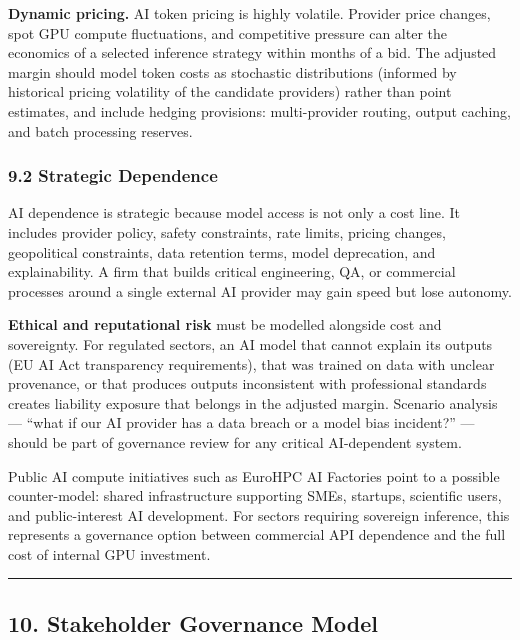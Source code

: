\documentclass[
]{article}
\begin{document}
\textbf{Dynamic pricing.} AI token pricing is highly volatile. Provider
price changes, spot GPU compute fluctuations, and competitive pressure
can alter the economics of a selected inference strategy within months
of a bid. The adjusted margin should model token costs as stochastic
distributions (informed by historical pricing volatility of the
candidate providers) rather than point estimates, and include hedging
provisions: multi-provider routing, output caching, and batch processing
reserves.

\subsubsection{9.2 Strategic Dependence}\label{strategic-dependence}

AI dependence is strategic because model access is not only a cost line.
It includes provider policy, safety constraints, rate limits, pricing
changes, geopolitical constraints, data retention terms, model
deprecation, and explainability. A firm that builds critical
engineering, QA, or commercial processes around a single external AI
provider may gain speed but lose autonomy.

\textbf{Ethical and reputational risk} must be modelled alongside cost
and sovereignty. For regulated sectors, an AI model that cannot explain
its outputs (EU AI Act transparency requirements), that was trained on
data with unclear provenance, or that produces outputs inconsistent with
professional standards creates liability exposure that belongs in the
adjusted margin. Scenario analysis --- ``what if our AI provider has a
data breach or a model bias incident?'' --- should be part of governance
review for any critical AI-dependent system.

Public AI compute initiatives such as EuroHPC AI Factories point to a
possible counter-model: shared infrastructure supporting SMEs, startups,
scientific users, and public-interest AI development. For sectors
requiring sovereign inference, this represents a governance option
between commercial API dependence and the full cost of internal GPU
investment.

\begin{center}\rule{0.5\linewidth}{0.5pt}\end{center}

\subsection{10. Stakeholder Governance
Model}\label{stakeholder-governance-model}
\end{document}
